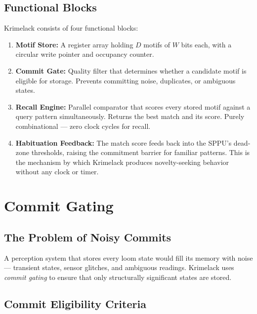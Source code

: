 \documentclass[11pt, a4paper]{article}
\begin{document}
\subsection{Functional Blocks}

Krimelack consists of four functional blocks:

\begin{enumerate}
  \item \textbf{Motif Store:} A register array holding $D$ motifs
        of $W$ bits each, with a circular write pointer and
        occupancy counter.

  \item \textbf{Commit Gate:} Quality filter that determines
        whether a candidate motif is eligible for storage.
        Prevents committing noise, duplicates, or ambiguous
        states.

  \item \textbf{Recall Engine:} Parallel comparator that scores
        every stored motif against a query pattern simultaneously.
        Returns the best match and its score. Purely combinational
        --- zero clock cycles for recall.

  \item \textbf{Habituation Feedback:} The match score feeds back
        into the SPPU's dead-zone thresholds, raising the
        commitment barrier for familiar patterns. This is the
        mechanism by which Krimelack produces novelty-seeking
        behavior without any clock or timer.
\end{enumerate}

\section{Commit Gating}

\subsection{The Problem of Noisy Commits}

A perception system that stores every loom state would fill its
memory with noise --- transient states, sensor glitches, and
ambiguous readings. Krimelack uses \textit{commit gating} to
ensure that only structurally significant states are stored.

\subsection{Commit Eligibility Criteria}
\end{document}
